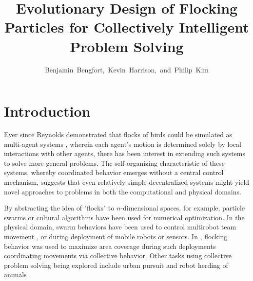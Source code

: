 \documentclass[12pt,journal,compsoc]{IEEEtran}
\begin{document}
\title{Evolutionary Design of Flocking Particles for Collectively Intelligent Problem Solving}
\author{Benjamin~Bengfort,~Kevin~Harrison,~and~Philip~Kim}


\maketitle

\IEEEdisplaynotcompsoctitleabstractindextext

\section{Introduction}

Ever since Reynolds demonstrated that flocks of birds could be simulated as multi-agent systems \cite{reynolds1987flocks}, wherein each agent's motion is determined solely by local interactions with other agents, there has been interest in extending such systems to solve more general problems. The self-organizing characteristic of these systems, whereby coordinated behavior emerges without a central control mechanism, suggests that even relatively simple decentralized systems might yield novel approaches to problems in both the computational and physical domains.

By abstracting the idea of "flocks" to $n$-dimensional spaces, for example, particle swarms \cite{kennedy1995particle,clerc2002particle} or cultural algorithms \cite{chung1996testbed} have been used for numerical optimization. In the physical domain, swarm behaviors have been used to control multirobot team movement \cite{balch1998behavior,ccelikkanat2010steering,hodgins1994robot}, or during deployment of mobile robots or sensors. In \cite{cheng2009distributed}, flocking behavior was used to maximize area coverage during such deployments coordinating movements via collective behavior. Other tasks using collective problem solving being explored include urban pursuit \cite{winder2004using} and robot herding of animals \cite{vaughan1998robot}.
\end{document}
